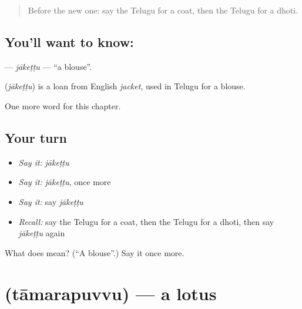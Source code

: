 \label{lesson:TE-C132-jakettu}



\begin{quote}
Before the new one: say the Telugu for a coat, then the Telugu for a dhoti.
\end{quote}

\subsection*{You'll want to know: }
\textbf{} — \emph{jākeṭṭu} — \textquotedblleft{}a blouse\textquotedblright{}.

\begin{cousinweb}
\textbf{} (\emph{jākeṭṭu}) is a loan from English \emph{jacket}, used in Telugu for a blouse.
\end{cousinweb}

\begin{grammarlens}[title={What you've built}]
One more word for this chapter.
\end{grammarlens}

\subsection*{Your turn}
\begin{itemize}
\raggedright
  \item \emph{Say it:} \emph{jākeṭṭu}
  \item \emph{Say it:} \emph{jākeṭṭu}, once more
  \item \emph{Say it:} say \emph{jākeṭṭu}
  \item \emph{Recall:} say the Telugu for a coat, then the Telugu for a dhoti, then say \emph{jākeṭṭu} again
\end{itemize}

\begin{tcolorbox}[breakable,colback=teal!4,colframe=teal!35!black,title={Before you move on}]
What does  mean? (\textquotedblleft{}A blouse\textquotedblright{}.) Say it once more.
\end{tcolorbox}
\section[\texorpdfstring{\te{తామరపువ్వు} (tāmarapuvvu)}{తామరపువ్వు (tāmarapuvvu)}]{ (tāmarapuvvu) — a lotus}

\label{lesson:TE-C132-tamarapuvvu}




